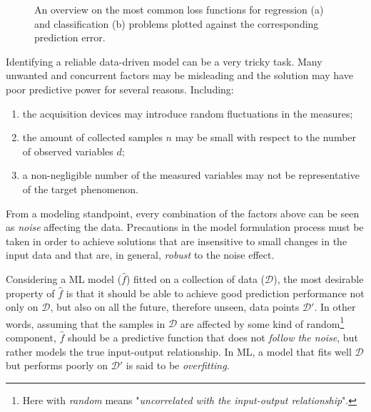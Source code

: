 	  \begin{figure}[!h]
	  	\centering
       \hfill%
	  	\caption{An overview on the most common loss functions for regression (a) and classification (b) problems plotted against the corresponding prediction error.}\label{fig:loss}
	  \end{figure}

	  Identifying a reliable data-driven model can be a very tricky task. Many unwanted and concurrent factors may be misleading and the solution may have poor predictive power for several reasons.
		Including:
		\begin{enumerate}
			\item the acquisition devices may introduce random fluctuations in the measures;
			\item the amount of collected samples $n$ may be small with respect to the number of observed variables $d$;
			\item a non-negligible number of the measured variables may not be representative of the target phenomenon.
	  \end{enumerate}
		From a modeling standpoint, every combination of the factors above can be seen as \textit{noise} affecting the data.
		Precautions in the model formulation process must be taken in order to achieve solutions that are insensitive to small changes in the input data and that are, in general, \textit{robust} to the noise effect.

		Considering a ML model ($\hat f$) fitted on a collection of data ($\mathcal{D}$), the most desirable property of $\hat f$ is that it should be able to achieve good prediction performance not only on $\mathcal{D}$, but also on all the future, therefore unseen, data points $\mathcal{D}'$.
		In other words, assuming that the samples in $\mathcal{D}$ are affected by some kind of random\footnote{ Here with \textit{random} means "\textit{uncorrelated with the input-output relationship}".} component, $\hat f$ should be a predictive function that does not \textit{follow the noise}, but rather models the true input-output relationship.
		In ML, a model that fits well $\mathcal{D}$ but performs poorly on $\mathcal{D}'$ is said to be \textit{overfitting}.

